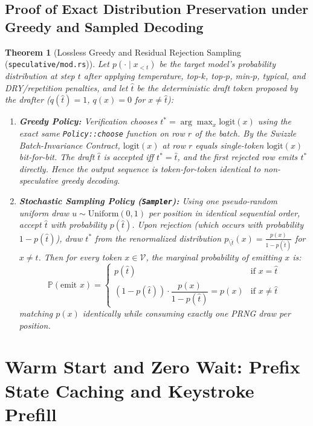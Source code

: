 \documentclass[10pt,a4paper]{article}
\theoremstyle{swzstyle}
\newtheorem{theorem}{Theorem}[section]
\newcommand{\code}[1]{\texttt{#1}}
\begin{document}
\subsection{Proof of Exact Distribution Preservation under Greedy and Sampled Decoding}

\begin{theorem}[Lossless Greedy and Residual Rejection Sampling (\texttt{speculative/mod.rs})]
Let $p(\cdot \mid x_{<t})$ be the target model's probability distribution at step $t$ after applying temperature, top-$k$, top-$p$, min-$p$, typical, and DRY/repetition penalties, and let $\hat{t}$ be the deterministic draft token proposed by the drafter ($q(\hat{t}) = 1$, $q(x) = 0$ for $x \neq \hat{t}$):
\begin{enumerate}
  \item \textbf{Greedy Policy:} Verification chooses $t^* = \arg\max_x \text{logit}(x)$ using the exact same \code{Policy::choose} function on row $r$ of the batch. By the Swizzle Batch-Invariance Contract, $\text{logit}(x)$ at row $r$ equals single-token $\text{logit}(x)$ bit-for-bit. The draft $\hat{t}$ is accepted iff $t^* = \hat{t}$, and the first rejected row emits $t^*$ directly. Hence the output sequence is token-for-token identical to non-speculative greedy decoding.
  \item \textbf{Stochastic Sampling Policy (\texttt{Sampler}):} Using one pseudo-random uniform draw $u \sim \text{Uniform}(0, 1)$ per position in identical sequential order, accept $\hat{t}$ with probability $p(\hat{t})$. Upon rejection (which occurs with probability $1 - p(\hat{t})$), draw $t^*$ from the renormalized distribution $p_{\setminus \hat{t}}(x) = \frac{p(x)}{1 - p(\hat{t})}$ for $x \neq \hat{t}$. Then for every token $x \in \mathcal{V}$, the marginal probability of emitting $x$ is:
  \begin{equation}
    \mathbb{P}(\text{emit } x) = \begin{cases} p(\hat{t}) & \text{if } x = \hat{t} \\[4pt] (1 - p(\hat{t})) \cdot \dfrac{p(x)}{1 - p(\hat{t})} = p(x) & \text{if } x \neq \hat{t} \end{cases}
  \end{equation}
  matching $p(x)$ identically while consuming exactly one PRNG draw per position.
\end{enumerate}
\end{theorem}

\section{Warm Start and Zero Wait: Prefix State Caching and Keystroke Prefill}
\end{document}
